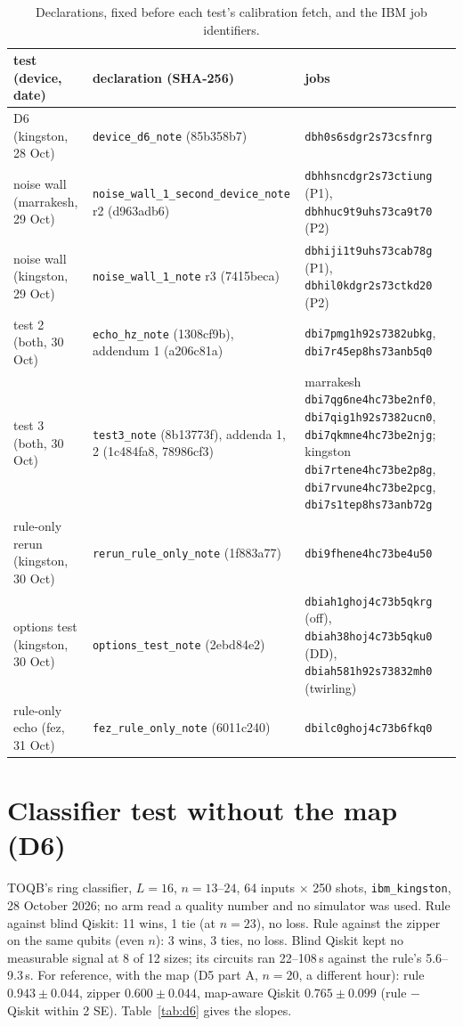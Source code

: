 \documentclass[11pt]{article}
\begin{document}
\begin{table}[h]
\centering
\footnotesize
\begin{tabular}{p{}p{}p{}}
\toprule
test (device, date) & declaration (SHA-256) & jobs\\
\midrule
D6 (kingston, 28 Oct) & \texttt{device\_d6\_note} (85b358b7) & \texttt{dbh0s6sdgr2s73csfnrg}\\
noise wall (marrakesh, 29 Oct) & \texttt{noise\_wall\_1\_second\_device\_note} r2 (d963adb6) & \texttt{dbhhsncdgr2s73ctiung} (P1), \texttt{dbhhuc9t9uhs73ca9t70} (P2)\\
noise wall (kingston, 29 Oct) & \texttt{noise\_wall\_1\_note} r3 (7415beca) & \texttt{dbhiji1t9uhs73cab78g} (P1), \texttt{dbhil0kdgr2s73ctkd20} (P2)\\
test 2 (both, 30 Oct) & \texttt{echo\_hz\_note} (1308cf9b), addendum 1 (a206c81a) & \texttt{dbi7pmg1h92s7382ubkg}, \texttt{dbi7r45ep8hs73anb5q0}\\
test 3 (both, 30 Oct) & \texttt{test3\_note} (8b13773f), addenda 1, 2 (1c484fa8, 78986cf3) & marrakesh \texttt{dbi7qg6ne4hc73be2nf0}, \texttt{dbi7qig1h92s7382ucn0}, \texttt{dbi7qkmne4hc73be2njg}; kingston \texttt{dbi7rtene4hc73be2p8g}, \texttt{dbi7rvune4hc73be2pcg}, \texttt{dbi7s1tep8hs73anb72g}\\
rule-only rerun (kingston, 30 Oct) & \texttt{rerun\_rule\_only\_note} (1f883a77) & \texttt{dbi9fhene4hc73be4u50}\\
options test (kingston, 30 Oct) & \texttt{options\_test\_note} (2ebd84e2) & \texttt{dbiah1ghoj4c73b5qkrg} (off), \texttt{dbiah38hoj4c73b5qku0} (DD), \texttt{dbiah581h92s73832mh0} (twirling)\\
rule-only echo (fez, 31 Oct) & \texttt{fez\_rule\_only\_note} (6011c240) & \texttt{dbilc0ghoj4c73b6fkq0}\\
\bottomrule
\end{tabular}
\caption{Declarations, fixed before each test's calibration fetch, and the IBM job identifiers.}\label{tab:decl}
\end{table}

\section{Classifier test without the map (D6)}
TOQB's ring classifier, $L=16$, $n=13$--$24$, 64 inputs $\times$ 250 shots, \texttt{ibm\_kingston}, 28 October 2026;
no arm read a quality number and no simulator was used. Rule against blind Qiskit: 11 wins, 1 tie (at $n=23$), no
loss. Rule against the zipper on the same qubits (even $n$): 3 wins, 3 ties, no loss. Blind Qiskit kept no measurable
signal at 8 of 12 sizes; its circuits ran 22--108\,\textmu s against the rule's 5.6--9.3\,\textmu s.
For reference, with the map (D5 part A, $n=20$, a different hour): rule $0.943\pm0.044$, zipper $0.600\pm0.044$,
map-aware Qiskit $0.765\pm0.099$ (rule $-$ Qiskit within 2 SE). Table~\ref{tab:d6} gives the slopes.
\end{document}
